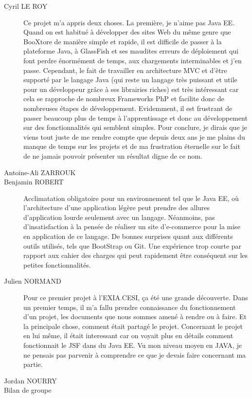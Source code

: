 \begin{description}
	\item[Cyril LE ROY]
	Ce projet m’a appris deux choses. 
	La première, je n’aime pas Java EE. Quand on est habitué à développer des sites Web du même genre que BooXtore de manière simple et rapide, il est difficile de passer à la plateforme Java, à GlassFish et ses maudites erreurs de déploiement qui font perdre énormément de temps, aux chargements interminables et j’en passe. 
	Cependant, le fait de travailler en architecture MVC et d’être supporté par le langage Java (qui reste un langage très puissant et utile pour un développeur grâce à ses librairies riches) est très intéressant car cela se rapproche de nombreux Frameworks PhP et facilite donc de nombreuses étapes de développement.
	Evidemment, il est frustrant de passer beaucoup plus de temps à l’apprentissage et donc au développement sur des fonctionnalités qui semblent simples. 
	Pour conclure, je dirais que je viens tout juste de me rendre compte que depuis deux ans je me plains du manque de temps sur les projets et de ma frustration éternelle sur le fait de ne jamais pouvoir présenter un résultat digne de ce nom.
	\item[Antoine-Ali ZARROUK]
	\item[Benjamin ROBERT]
	Acclimatation obligatoire pour un environnement tel que le Java EE, où l'architecture d'une application légère peut prendre des allures d'application lourde seulement avec un langage.
Néanmoins, pas d'insatisfaction à la pensée de réaliser un site d'e-commerce pour la mise en application de ce langage.
De bonnes surprises quant aux différents outils utilisés, tels que BootStrap ou Git.
Une expérience trop courte par rapport aux cahier des charges qui peut rapidement être conséquent sur les petites fonctionnalités.
	\item[Julien NORMAND]
	Pour ce premier projet à l'EXIA.CESI, ça été une grande découverte. Dans un premier temps, il m'a fallu prendre connaissance du fonctionnement d'un projet, les documents que nous sommes amené à rendre ou à faire. Et la principale chose, comment était partagé le projet.
	Concernant le projet en lui même, il était interessant car on voyait plus en détails comment fonctionnait le JSF dans du Java EE. Vu mon niveau moyen en JAVA, je ne pensais pas parvenir à comprendre ce que je devais faire concernant ma partie. 
	\item[Jordan NOURRY]
	\item[Bilan de groupe]

\end{description}
